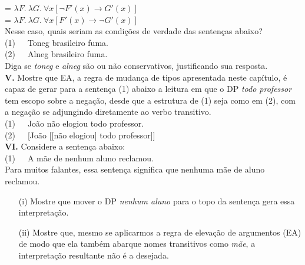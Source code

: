 \begin{tcolorbox}[parbox=false,boxrule=0pt,sharp corners,breakable]
\n {} = $\lambda F.\ \lambda G.\ \forall x [\neg F'(x)
\rightarrow G'(x)]$\\

\n {} = $\lambda F.\ \lambda G.\ \forall x [F'(x)
\rightarrow \neg G'(x)]$\\

\n Nesse caso, quais seriam as condições de verdade das sentenças
abaixo?\\

\n (1)\ \ \  Toneg brasileiro fuma.\\

\n (2)\ \ \  Alneg brasileiro fuma.\\

\n Diga se \textit{toneg} e \textit{alneg} são ou não
conservativos,
justificando sua resposta.\\

\n \textbf{V.} Mostre que EA, a regra de mudança de tipos
apresentada neste capítulo, é capaz de gerar para a sentença
(1) abaixo a leitura em que o DP \textit{todo professor} tem
escopo sobre a negação, desde que a estrutura de (1) seja como em (2), com a negação se adjungindo diretamente ao verbo transitivo.\\

\n (1)\ \ \  João não elogiou todo professor.\\

\n (2)\ \ \  [João [[não elogiou] todo professor]] \\

\n \textbf{VI.} Considere a sentença abaixo:\\

\n (1)\ \ \  A mãe de nenhum aluno reclamou.\\

\n Para muitos falantes, essa sentença significa que nenhuma mãe
de aluno reclamou.

\begin{enumerate}

\item[(i)] Mostre que mover o DP \textit{nenhum aluno} para o
    topo da sentença gera essa interpretação.

\item[(ii)] Mostre que, mesmo se aplicarmos a regra de elevação de argumentos (EA) de modo que ela também
    abarque nomes transitivos como \textit{mãe}, a
    interpretação resultante não é a desejada.

\end{enumerate}


\end{tcolorbox}




















